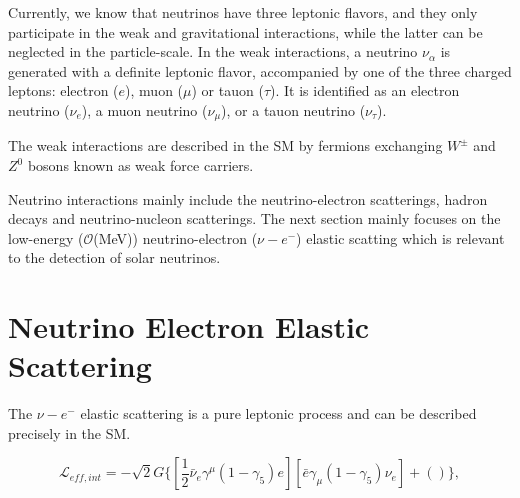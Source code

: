 Currently, we know that neutrinos have three leptonic flavors, and they only participate in the weak and gravitational interactions, while the latter can be neglected in the particle-scale. In the weak interactions, a neutrino $\nu_\alpha$ is generated with a definite leptonic flavor, accompanied by one of the three charged leptons: electron ($e$), muon ($\mu$) or tauon ($\tau$). It is identified as an electron neutrino ($\nu_e$), a muon neutrino ($\nu_\mu$), or a tauon neutrino ($\nu_\tau$).

The weak interactions are described in the SM by fermions exchanging $W^{\pm}$ and $Z^0$ bosons known as weak force carriers.

Neutrino interactions mainly include the neutrino-electron scatterings, hadron decays and neutrino-nucleon scatterings\cite{giunti2007fundamentals}. The next section mainly focuses on the low-energy ($\mathcal{O}$(MeV)) neutrino-electron ($\nu-e^-$) elastic scatting which is relevant to the detection of solar neutrinos.

\section{Neutrino Electron Elastic Scattering}\label{sect:nuInteraction}
The $\nu-e^-$ elastic scattering is a pure leptonic process and can be described precisely in the SM.


\begin{equation}
\mathcal{L}_{eff,int}=-\sqrt{2}G\{[\frac{1}{2}\bar{\nu}_e\gamma^\mu(1-\gamma_5)e][\bar{e}\gamma_\mu(1-\gamma_5)\nu_e]+()\},
\end{equation}

